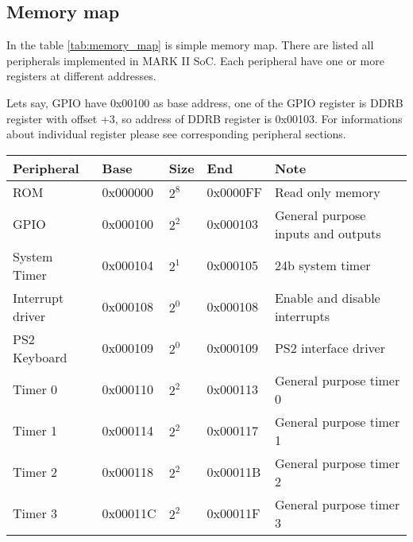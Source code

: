 \subsection{Memory map}

In the table \ref{tab:memory_map} is simple memory map. There are listed all
peripherals implemented in MARK II SoC. Each peripheral have one or more registers at different
addresses.

Lets say, GPIO have 0x00100 as base address, one of the GPIO register
is DDRB register with offset +3, so address of DDRB register is 0x00103. For
informations about individual register please see corresponding peripheral sections.

\begin{table}[h]
    \centering
    \begin{tabular}{|l|l|l|l|l|}
        \hline
        \textbf{Peripheral} & \textbf{Base} & \textbf{Size} & \textbf{End} & \textbf{Note}                                  \\ \hline
        ROM                 & 0x000000      & $2^{8}$       & 0x0000FF     & Read only memory                               \\ \hline
        GPIO                & 0x000100      & $2^{2}$       & 0x000103     & General purpose inputs and outputs             \\ \hline
        System Timer        & 0x000104      & $2^{1}$       & 0x000105     & 24b system timer                               \\ \hline
        Interrupt driver    & 0x000108      & $2^{0}$       & 0x000108     & Enable and disable interrupts                  \\ \hline
        PS2 Keyboard        & 0x000109      & $2^{0}$       & 0x000109     & PS2 interface driver                           \\ \hline
        Timer 0             & 0x000110      & $2^{2}$       & 0x000113     & General purpose timer 0                        \\ \hline
        Timer 1             & 0x000114      & $2^{2}$       & 0x000117     & General purpose timer 1                        \\ \hline
        Timer 2             & 0x000118      & $2^{2}$       & 0x00011B     & General purpose timer 2                        \\ \hline
        Timer 3             & 0x00011C      & $2^{2}$       & 0x00011F     & General purpose timer 3                        \\ \hline

\end{tabular}
\end{table}
